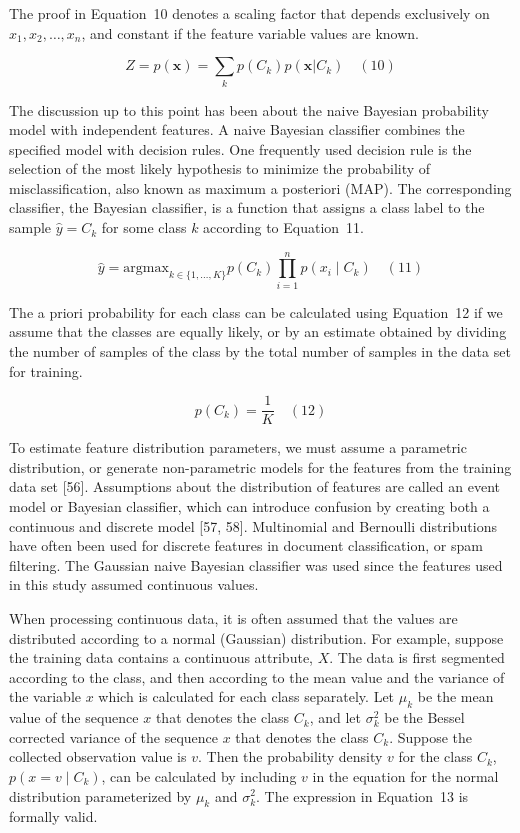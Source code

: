 \documentclass[preprint,12pt]{elsarticle}
\begin{document}
The proof in Equation~10 denotes a scaling factor that depends exclusively on $x_{1}, x_{2}, \ldots, x_{n}$, and constant if the feature variable values are known.

\begin{equation}
	Z = p(\mathbf{x}) = \sum_{k} p(C_{k}) p(\mathbf{x}|C_{k})
	\quad\left(10\right)
\end{equation}

The discussion up to this point has been about the naive Bayesian probability model with independent features. A naive Bayesian classifier combines the specified model with decision rules. One frequently used decision rule is the selection of the most likely hypothesis to minimize the probability of misclassification, also known as maximum a posteriori (MAP). The corresponding classifier, the Bayesian classifier, is a function that assigns a class label to the sample $\hat{y} = C_{k}$ for some class $k$ according to Equation~11.

\begin{equation}
	\hat{y} = \mathrm{argmax}_{k\in \{1, \ldots, K\}} p(C_{k}) \prod_{i=1}^{n} p(x_{i}\mid C_{k})
	\quad\left(11\right)
\end{equation}

The a priori probability for each class can be calculated using Equation~12 if we assume that the classes are equally likely, or by an estimate obtained by dividing the number of samples of the class by the total number of samples in the data set for training.

\begin{equation}
	p(C_{k}) = \frac{1}{K}
	\quad\left(12\right)
\end{equation}

To estimate feature distribution parameters, we must assume a parametric distribution, or generate non-parametric models for the features from the training data set [56]. Assumptions about the distribution of features are called an event model or Bayesian classifier, which can introduce confusion by creating both a continuous and discrete model [57, 58]. Multinomial and Bernoulli distributions have often been used for discrete features in document classification, or spam filtering. The Gaussian naive Bayesian classifier was used since the features used in this study assumed continuous values.

When processing continuous data, it is often assumed that the values are distributed according to a normal (Gaussian) distribution. For example, suppose the training data contains a continuous attribute, $X$. The data is first segmented according to the class, and then according to the mean value and the variance of the variable $x$ which is calculated for each class separately. Let $\mu_{k}$ be the mean value of the sequence $x$ that denotes the class $C_{k}$, and let $\sigma_{k}^{2}$ be the Bessel corrected variance of the sequence $x$ that denotes the class $C_{k}$. Suppose the collected observation value is $v$. Then the probability density $v$ for the class $C_{k}$, $p(x=v\mid C_{k})$, can be calculated by including $v$ in the equation for the normal distribution parameterized by $\mu_{k}$ and $\sigma_{k}^{2}$. The expression in Equation~13 is formally valid.
\end{document}
